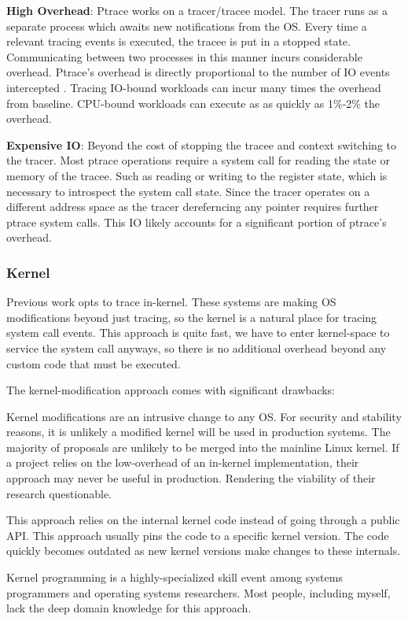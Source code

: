 \begin{compactitem}
    \item \textbf{High Overhead}: Ptrace works on a tracer/tracee model. The tracer runs as a separate process which awaits new notifications from the OS. Every time a relevant tracing events is executed, the tracee is put in a stopped state. Communicating between two processes in this manner incurs considerable overhead. Ptrace's overhead is directly proportional to the number of IO events intercepted \cite{dettrace}. Tracing IO-bound workloads can incur many times the overhead from baseline. CPU-bound workloads can execute as as quickly as 1\%-2\% the overhead.
    \item \textbf{Expensive IO}: Beyond the cost of stopping the tracee and context switching to the tracer. Most ptrace operations require a system call for reading the state or memory of the tracee. Such as reading or writing to the register state, which is necessary to introspect the system call state. Since the tracer operates on a different address space as the tracer dereferncing any pointer requires further ptrace system calls. This IO likely accounts for a significant portion of ptrace's overhead.
\end{compactitem}

\subsubsection{Kernel}
Previous work \cite{arnold, racepro} opts to trace in-kernel. These systems are making OS modifications beyond just tracing, so the kernel is a natural place for tracing system call events. This approach is quite fast, we have to enter kernel-space to service the system call anyways, so there is no additional overhead beyond any custom code that must be executed.

The kernel-modification approach comes with significant drawbacks:

\begin{compactitem}
    \item Kernel modifications are an intrusive change to any OS. For security and stability reasons, it is unlikely a modified kernel will be used in production systems. The majority of proposals are unlikely to be merged into the mainline Linux kernel. If a project relies on the low-overhead of an in-kernel implementation, their approach may never be useful in production. Rendering the viability of their research questionable.
    \item This approach relies on the internal kernel code instead of going through a public API. This approach usually pins the code to a specific kernel version. The code quickly becomes outdated as new kernel versions make changes to these internals.
    \item Kernel programming is a highly-specialized skill event among systems programmers and operating systems researchers. Most people, including myself, lack the deep domain knowledge for this approach.
\end{compactitem}

